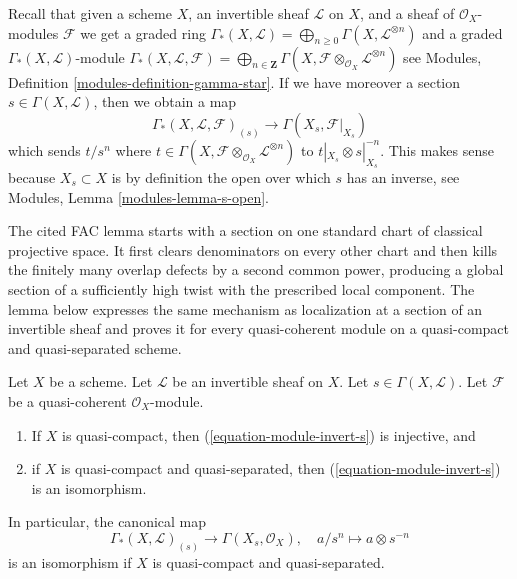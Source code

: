\noindent
Recall that given a scheme $X$, an invertible sheaf $\mathcal{L}$
on $X$, and a sheaf of $\mathcal{O}_X$-modules $\mathcal{F}$
we get a graded ring
$\Gamma_*(X, \mathcal{L}) =
\bigoplus\nolimits_{n \geq 0} \Gamma(X, \mathcal{L}^{\otimes n})$
and a graded $\Gamma_*(X, \mathcal{L})$-module
$\Gamma_*(X, \mathcal{L}, \mathcal{F}) =
\bigoplus\nolimits_{n \in \mathbf{Z}}
\Gamma(X, \mathcal{F} \otimes_{\mathcal{O}_X} \mathcal{L}^{\otimes n})$
see Modules, Definition \ref{modules-definition-gamma-star}.
If we have moreover a section $s \in \Gamma(X, \mathcal{L})$, then
we obtain a map
\begin{equation}
\label{equation-module-invert-s}
\Gamma_*(X, \mathcal{L}, \mathcal{F})_{(s)}
\longrightarrow
\Gamma(X_s, \mathcal{F}|_{X_s})
\end{equation}
which sends $t/s^n$ where
$t \in \Gamma(X, \mathcal{F} \otimes_{\mathcal{O}_X} \mathcal{L}^{\otimes n})$
to $t|_{X_s} \otimes s|_{X_s}^{-n}$. This makes sense
because $X_s \subset X$ is by definition the open over which
$s$ has an inverse, see Modules, Lemma \ref{modules-lemma-s-open}.

\begin{lemma}
\label{lemma-invert-s-sections}
\begin{reference}
\cite[Section 6.8]{EGA1-second}
\cite[Chapter III, \S 2, no. 55, Lemma 2,
pp. 247--248]{FAC}
\end{reference}
\begin{history}
The cited FAC lemma starts with a section on one standard chart of classical
projective space. It first clears denominators on every other chart and then
kills the finitely many overlap defects by a second common power, producing a
global section of a sufficiently high twist with the prescribed local
component. The lemma below expresses the same mechanism as localization at a
section of an invertible sheaf and proves it for every quasi-coherent module
on a quasi-compact and quasi-separated scheme.
\end{history}
Let $X$ be a scheme. Let $\mathcal{L}$ be an invertible sheaf on $X$.
Let $s \in \Gamma(X, \mathcal{L})$. Let $\mathcal{F}$ be a quasi-coherent
$\mathcal{O}_X$-module.
\begin{enumerate}
\item If $X$ is quasi-compact, then (\ref{equation-module-invert-s})
is injective, and
\item if $X$ is quasi-compact and quasi-separated, then
(\ref{equation-module-invert-s}) is an isomorphism.
\end{enumerate}
In particular, the canonical map
$$
\Gamma_*(X, \mathcal{L})_{(s)}
\longrightarrow
\Gamma(X_s, \mathcal{O}_X),\quad
a/s^n \longmapsto a \otimes s^{-n}
$$
is an isomorphism if $X$ is quasi-compact and quasi-separated.
\end{lemma}

